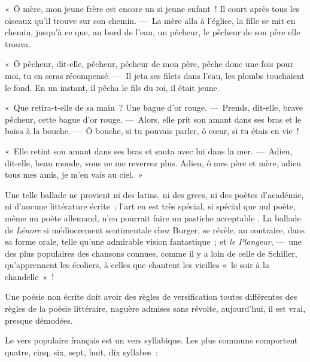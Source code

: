 \documentclass[french,twoside]{book} %
\begin{document}
« Ô mère, mon jeune frère est encore un si jeune enfant ! Il court après tous les oiseaux qu’il trouve sur son chemin. — La mère alla à l’église, la fille se mit en chemin, jusqu’à ce que, au bord de l’eau, un pêcheur, le pêcheur de son père elle trouva.\par
« Ô pêcheur, dit-elle, pêcheur, pêcheur de mon père, pêche donc une fois pour moi, tu en seras récompensé. — Il jeta ses filets dans l’eau, les plombs touchaient le fond. En un instant, il pêcha le fils du roi, il était jeune.\par
« Que retira-t-elle de sa main ? Une bague d’or rouge. — Prends, dit-elle, brave pêcheur, cette bague d’or rouge. — Alors, elle prit son amant dans ses bras et le baisa à la bouche. — Ô bouche, si tu pouvais parler, ô cœur, si tu étais en vie !\par
« Elle retint son amant dans ses bras et sauta avec lui dans la mer. — Adieu, dit-elle, beau monde, vous ne me reverrez plus. Adieu, ô mes père et mère, adieu tous mes amis, je m’en vais au ciel. »\par
Une telle ballade ne provient ni des latins, ni des grecs, ni des poètes d’académie, ni d’aucune littérature écrite ; l’art en est très spécial, si spécial que nul poète, même un poète allemand, n’en pourrait faire un pastiche acceptable . La ballade de {\itshape Lénore} si médiocrement sentimentale chez Burger, se révèle, au contraire, dans sa forme orale, telle qu’une admirable vision fantastique ; et {\itshape le Plongeur}, — une des plus populaires des chansons connues, comme il y a loin de celle de Schiller, qu’apprennent les écoliers, à celles que chantent les vieilles « le soir à la chandelle » !\par
Une poésie non écrite doit avoir des règles de versification toutes différentes des règles de la poésie littéraire, naguère admises sans révolte, aujourd’hui, il est vrai, presque démodées.\par
\par
Le vers populaire français est un vers syllabique. Les plus communs comportent quatre, cinq, six, sept, huit, dix syllabes :\par
\end{document}
